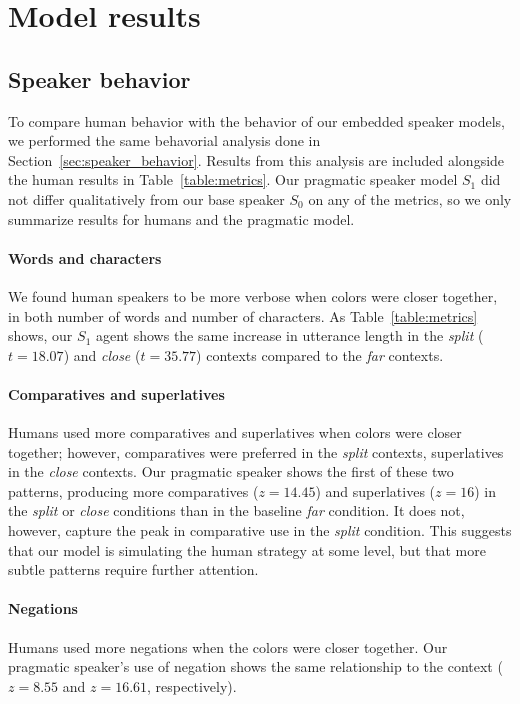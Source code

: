 \documentclass[11pt,letterpaper]{article}
\newcommand{\Speaker}{S}
\renewcommand{\|}{\mid}
\newcommand{\secref}[1]{Section~\ref{#1}}
\newcommand{\Tabref}[1]{Table~\ref{#1}}
\newcommand{\tabref}[1]{Table~\ref{#1}}
\newcommand{\cond}{\emph}
\begin{document}
\section{Model results}

\subsection{Speaker behavior}

To compare human behavior with the behavior of our embedded speaker models,
we performed the same behavorial analysis done in \secref{sec:speaker_behavior}.
Results from this analysis are included alongside the human results in
\Tabref{table:metrics}.
Our pragmatic speaker model $\Speaker_1$ did not differ
qualitatively from our base speaker $\Speaker_0$ on any of the metrics,
so we only summarize results for humans and the pragmatic model.

\paragraph{Words and characters} We found human speakers to be more verbose when
colors were closer together, in both number of words and number of characters.
As \tabref{table:metrics} shows, our $\Speaker_{1}$  agent
shows the same increase in utterance length in the \cond{split} ($t = 18.07$) and \cond{close} ($t = 35.77$) contexts compared to the \cond{far} contexts.

\paragraph{Comparatives and superlatives} Humans used more comparatives and
superlatives when colors were closer together; however, comparatives were
preferred in the  \cond{split} contexts, superlatives in
the \cond{close}
 contexts. Our pragmatic speaker shows the first of these two patterns,
producing  more comparatives ($z = 14.45$) and superlatives ($z = 16$) in the \cond{split} or \cond{close} conditions than in the baseline \cond{far} condition. It does not, however, capture the peak in comparative use in the \emph{split} condition. This suggests that our model is simulating the human strategy at some level, but that more subtle patterns require further attention.

\paragraph{Negations} Humans used more negations when the colors were closer
together. Our pragmatic speaker's use of negation shows the  same relationship to the context ($z = 8.55$ and $z= 16.61$, respectively).
\end{document}
